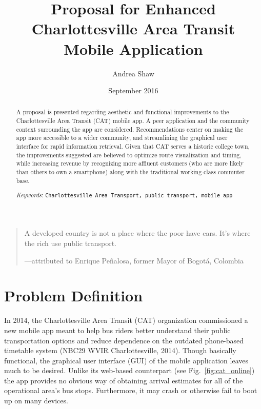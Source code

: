 \documentclass[12pt,letterpaper]{article}
\title{Proposal for Enhanced Charlottesville Area Transit Mobile Application}
\author{Andrea Shaw \\ \email{rcs8vq@virginia.edu}}%
\affil{Department of Computer Science \\ University of Virginia}
\date{September 2016}
\begin{document}
\maketitle

\begin{abstract}

    A proposal is presented regarding aesthetic and functional improvements to
    the Charlottesville Area Transit (CAT) mobile app. A peer application and the
    community context surrounding the app are considered. Recommendations
    center on making the app more accessible to a wider community, and
    streamlining the graphical user interface for rapid information retrieval.
    Given that CAT serves a historic college town, the improvements suggested
    are believed to optimize route visualization and timing, while increasing
    revenue by recognizing more affluent customers
    (who are more likely than others to own a smartphone) along
    with the traditional working-class commuter base.


    \bigskip
    \noindent \emph{Keywords}: {\tt Charlottesville Area Transport, public transport, mobile app}
\end{abstract}

\vspace{5mm}

\begin{quote}
A developed country is not a place where the poor have cars. It's where the rich use public transport.

\raggedleft ---attributed to Enrique Pe\~{n}alosa, former Mayor of Bogot\'{a}, Colombia
\end{quote}

\section{Problem Definition}
In 2014, the Charlottesville Area Transit (CAT) organization commissioned a new
mobile app meant to help bus riders better understand their public
transportation options and reduce dependence on the outdated phone-based
timetable system (NBC29 WVIR Charlottesville, 2014). Though basically
functional, the graphical user interface (GUI) of the mobile application leaves
much to be desired. Unlike its web-based counterpart (see Fig.~\ref{fig:cat_online})
the app provides no obvious way of obtaining arrival estimates for all of the
operational area's
bus stops. Furthermore, it may crash or otherwise fail to boot up on many
devices.
\end{document}
